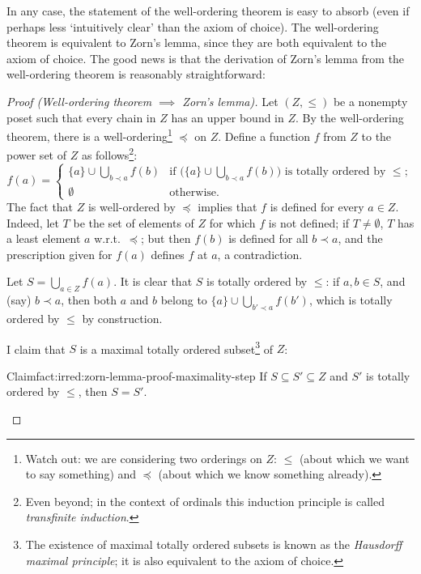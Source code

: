 In any case, the statement of the well-ordering theorem is easy to
absorb (even if perhaps less `intuitively clear' than the axiom of
choice). The well-ordering theorem is equivalent to Zorn's lemma,
since they are both equivalent to the axiom of choice. The good news
is that the derivation of Zorn's lemma from the well-ordering theorem
is reasonably straightforward:
\begin{proof}[Proof (Well-ordering theorem $\implies$ Zorn's lemma)]
  Let $(Z, \leq)$ be a nonempty poset such that every chain in $Z$ has
  an upper bound in $Z$. By the well-ordering theorem, there is a
  well-ordering\footnote{Watch out: we are considering two orderings
    on $Z$: $\leq$ (about which we want to say something) and
    $\preceq$ (about which we know something already).} $\preceq$ on
  $Z$. Define a function $f$ from $Z$ to the power set of $Z$ as
  follows\footnote{Even beyond; in the context of ordinals this
    induction principle is called \emph{transfinite induction}.}:
  \[f(a) = \begin{cases} \{a\} \cup \bigcup_{b \prec a} f(b) &
      \text{if } \bigl(\{a\} \cup {\textstyle\bigcup_{b \prec a}}
      f(b)\bigr)
                                                               \text{ is totally ordered by } \leq; \\[4pt]
    \emptyset & \text{otherwise.}
  \end{cases}\]
The fact that $Z$ is well-ordered by $\preceq$ implies that $f$ is defined
for every $a \in Z$. Indeed, let $T$ be the set of elements of $Z$ for
which $f$ is not defined; if $T \neq \emptyset$, $T$ has a least element
$a$ w.r.t.\ $\preceq$; but then $f(b)$ is defined for all $b \prec a$,
and the prescription given for $f(a)$ defines $f$ at $a$, a
contradiction.

Let $S = \bigcup_{a \in Z} f(a)$. It is clear that $S$ is totally
ordered by $\leq$: if $a, b \in S$, and (say) $b \prec a$, then both
$a$ and $b$ belong to $\{a\} \cup \bigcup_{b' \prec a} f(b')$, which
is totally ordered by $\leq$ by construction.

I claim that $S$ is a maximal totally ordered subset\footnote{The
  existence of maximal totally ordered subsets is known as the
  \emph{Hausdorff maximal principle}; it is also equivalent to the
  axiom of choice.} of $Z$:

\begin{fact}{Claim}{fact:irred:zorn-lemma-proof-maximality-step}
  If $S \subseteq S' \subseteq Z$ and $S'$ is totally ordered by
  $\leq$, then $S = S'$.
\end{fact}


\end{proof}
